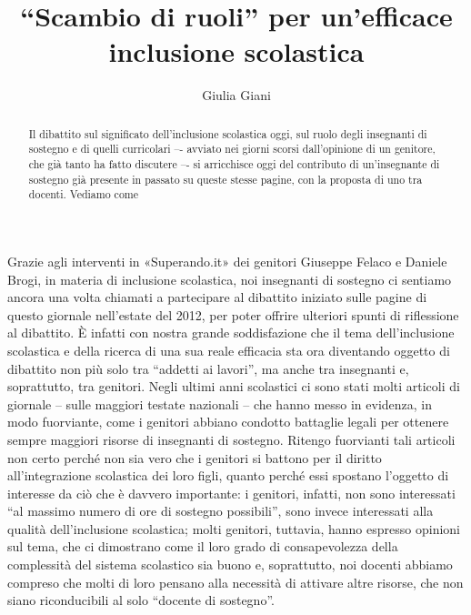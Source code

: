 \author{Giulia Giani}
\title{“Scambio di ruoli” per un'efficace inclusione scolastica}
\label{cha:giani300413}
\begin{abstract}
Il dibattito sul significato dell'inclusione scolastica oggi, sul ruolo degli insegnanti di sostegno e di quelli curricolari –- avviato nei giorni scorsi dall'opinione di un genitore, che già tanto ha fatto discutere –- si arricchisce oggi del contributo di un'insegnante di sostegno già presente in passato su queste stesse pagine, con la proposta di uno  tra docenti. Vediamo come
\end{abstract}
\maketitle
Grazie agli interventi in «Superando.it» dei genitori Giuseppe Felaco e Daniele Brogi, in materia di inclusione scolastica, noi insegnanti di sostegno ci sentiamo ancora una volta chiamati a partecipare al dibattito iniziato sulle pagine di questo giornale nell'estate del 2012, per poter offrire ulteriori spunti di riflessione al dibattito. È infatti con nostra grande soddisfazione che il tema dell'inclusione scolastica e della ricerca di una sua reale efficacia sta ora diventando oggetto di dibattito non più solo tra “addetti ai lavori”, ma anche tra insegnanti e, soprattutto, tra genitori.
Negli ultimi anni scolastici ci sono stati molti articoli di giornale – sulle maggiori testate nazionali – che hanno messo in evidenza, in modo fuorviante, come i genitori abbiano condotto battaglie legali per ottenere sempre maggiori risorse di insegnanti di sostegno. Ritengo fuorvianti tali articoli non certo perché non sia vero che i genitori si battono per il diritto all'integrazione scolastica dei loro figli, quanto perché essi spostano l'oggetto di interesse da ciò che è davvero importante: i genitori, infatti, non sono interessati “al massimo numero di ore di sostegno possibili”, sono invece interessati alla qualità dell'inclusione scolastica; molti genitori, tuttavia, hanno espresso opinioni sul tema, che ci dimostrano come il loro grado di consapevolezza della complessità del sistema scolastico sia buono e, soprattutto, noi docenti abbiamo compreso che molti di loro pensano alla necessità di attivare altre risorse, che non siano riconducibili al solo “docente di sostegno”.

